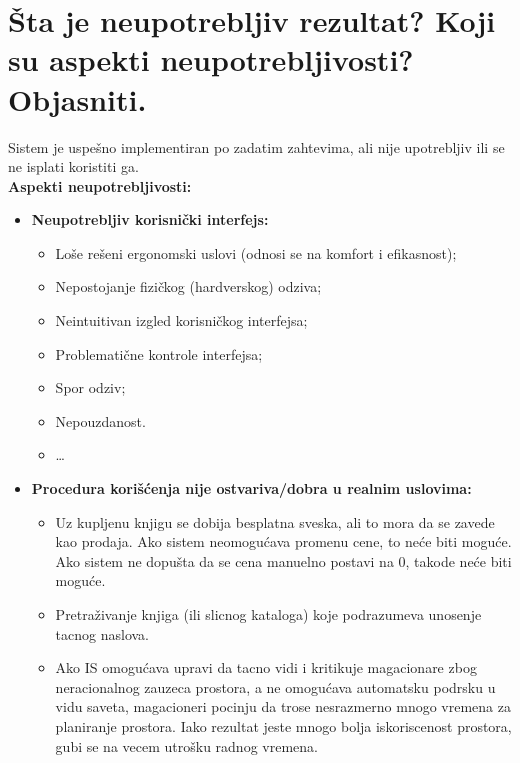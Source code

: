 \documentclass[a4paper]{article}
\begin{document}
\section{Šta je neupotrebljiv rezultat? Koji su aspekti neupotrebljivosti? Objasniti.}
  Sistem je uspešno implementiran po zadatim zahtevima, ali nije upotrebljiv ili se ne isplati
  koristiti ga.\\
  \textbf{Aspekti neupotrebljivosti:}
  \begin{itemize}
    \item \textbf{Neupotrebljiv korisnički interfejs:}
    \begin{itemize}
      \item Loše rešeni ergonomski uslovi (odnosi se na komfort i efikasnost);
      \item Nepostojanje fizičkog (hardverskog) odziva;
      \item Neintuitivan izgled korisničkog interfejsa;
      \item Problematične kontrole interfejsa;
      \item Spor odziv;
      \item Nepouzdanost.
      \item \dots
    \end{itemize}
    \item \textbf{Procedura korišćenja nije ostvariva/dobra u realnim uslovima:}
    \begin{itemize}
      \item Uz kupljenu knjigu se dobija besplatna sveska, ali to mora da se zavede kao prodaja. 
            Ako sistem neomogućava promenu cene, to neće biti moguće. 
            Ako sistem ne dopušta da se cena manuelno postavi na 0, takode neće biti moguće.
      \item Pretraživanje knjiga (ili slicnog kataloga) koje podrazumeva unosenje tacnog naslova.
      \item Ako IS omogućava upravi da tacno vidi i kritikuje magacionare zbog neracionalnog zauzeca 
            prostora, a ne omogućava automatsku podrsku u vidu saveta, 
            magacioneri pocinju da trose nesrazmerno mnogo vremena za planiranje prostora. 
            Iako rezultat jeste mnogo bolja iskoriscenost prostora, 
            gubi se na vecem utrošku radnog vremena.
    \end{itemize}
  \end{itemize}
\end{document}
